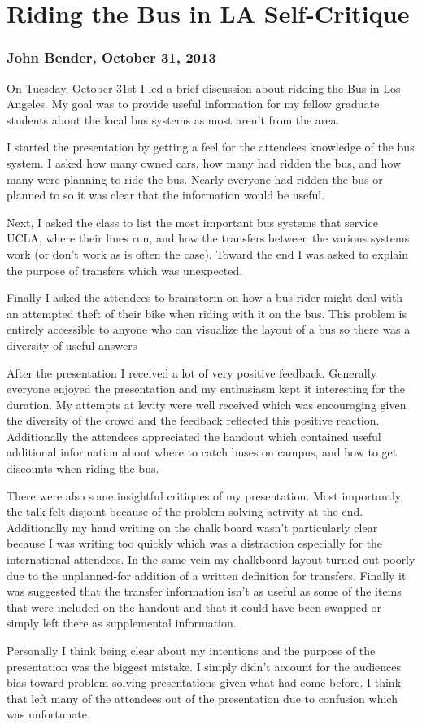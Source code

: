 \documentclass[pdftex,12pt,a4paper]{report}
\begin{document}
\section{Riding the Bus in LA Self-Critique}
\subsubsection{John Bender, October 31, 2013}

On Tuesday, October 31st I led a brief discussion about ridding the Bus in Los Angeles. My goal was to provide useful information for my fellow graduate students about the local bus systems as most aren't from the area.

I started the presentation by getting a feel for the attendees knowledge of the bus system. I asked how many owned cars, how many had ridden the bus, and how many were planning to ride the bus. Nearly everyone had ridden the bus or planned to so it was clear that the information would be useful.

Next, I asked the class to list the most important bus systems that service UCLA, where their lines run, and how the transfers between the various systems work (or don't work as is often the case). Toward the end I was asked to explain the purpose of transfers which was unexpected.

Finally I asked the attendees to brainstorm on how a bus rider might deal with an attempted theft of their bike when riding with it on the bus. This problem is entirely accessible to anyone who can visualize the layout of a bus so there was a diversity of useful answers

After the presentation I received a lot of very positive feedback. Generally everyone enjoyed the presentation and my enthusiasm kept it interesting for the duration. My attempts at levity were well received which was encouraging given the diversity of the crowd and the feedback reflected this positive reaction. Additionally the attendees appreciated the handout which contained useful additional information about where to catch buses on campus, and how to get discounts when riding the bus.

There were also some insightful critiques of my presentation. Most importantly, the talk felt disjoint because of the problem solving activity at the end. Additionally my hand writing on the chalk board wasn't particularly clear because I was writing too quickly which was a distraction especially for the international attendees. In the same vein my chalkboard layout turned out poorly due to the unplanned-for addition of a written definition for transfers. Finally it was suggested that the transfer information isn't as useful as some of the items that were included on the handout and that it could have been swapped or simply left there as supplemental information.

Personally I think being clear about my intentions and the purpose of the presentation was the biggest mistake. I simply didn't account for the audiences bias toward problem solving presentations given what had come before. I think that left many of the attendees out of the presentation due to confusion which was unfortunate.
\end{document}
